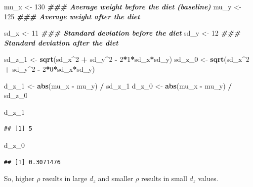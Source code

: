 \documentclass[
]{book}
\newenvironment{Shaded}{\begin{snugshade}}{\end{snugshade}}
\newcommand{\DecValTok}[1]{\textcolor[rgb]{0.00,0.00,0.81}{#1}}
\newcommand{\DocumentationTok}[1]{\textcolor[rgb]{0.56,0.35,0.01}{\textbf{\textit{#1}}}}
\newcommand{\FunctionTok}[1]{\textcolor[rgb]{0.13,0.29,0.53}{\textbf{#1}}}
\newcommand{\NormalTok}[1]{#1}
\newcommand{\OtherTok}[1]{\textcolor[rgb]{0.56,0.35,0.01}{#1}}
\newcommand{\SpecialCharTok}[1]{\textcolor[rgb]{0.81,0.36,0.00}{\textbf{#1}}}
\begin{document}
\begin{Shaded}
\begin{Highlighting}[]
\NormalTok{mu\_x }\OtherTok{\textless{}{-}} \DecValTok{130}     \DocumentationTok{\#\#\# Average weight before the diet (baseline)}
\NormalTok{mu\_y }\OtherTok{\textless{}{-}} \DecValTok{125}     \DocumentationTok{\#\#\# Average weight after the diet}

\NormalTok{sd\_x }\OtherTok{\textless{}{-}} \DecValTok{11}      \DocumentationTok{\#\#\# Standard deviation before the diet}
\NormalTok{sd\_y }\OtherTok{\textless{}{-}} \DecValTok{12}      \DocumentationTok{\#\#\# Standard deviation after the diet}

\NormalTok{sd\_z\_1 }\OtherTok{\textless{}{-}} \FunctionTok{sqrt}\NormalTok{(sd\_x}\SpecialCharTok{\^{}}\DecValTok{2} \SpecialCharTok{+}\NormalTok{ sd\_y}\SpecialCharTok{\^{}}\DecValTok{2} \SpecialCharTok{{-}} \DecValTok{2}\SpecialCharTok{*}\DecValTok{1}\SpecialCharTok{*}\NormalTok{sd\_x}\SpecialCharTok{*}\NormalTok{sd\_y)}
\NormalTok{sd\_z\_0 }\OtherTok{\textless{}{-}} \FunctionTok{sqrt}\NormalTok{(sd\_x}\SpecialCharTok{\^{}}\DecValTok{2} \SpecialCharTok{+}\NormalTok{ sd\_y}\SpecialCharTok{\^{}}\DecValTok{2} \SpecialCharTok{{-}} \DecValTok{2}\SpecialCharTok{*}\DecValTok{0}\SpecialCharTok{*}\NormalTok{sd\_x}\SpecialCharTok{*}\NormalTok{sd\_y)}

\NormalTok{d\_z\_1 }\OtherTok{\textless{}{-}} \FunctionTok{abs}\NormalTok{(mu\_x }\SpecialCharTok{{-}}\NormalTok{ mu\_y) }\SpecialCharTok{/}\NormalTok{ sd\_z\_1}
\NormalTok{d\_z\_0 }\OtherTok{\textless{}{-}} \FunctionTok{abs}\NormalTok{(mu\_x }\SpecialCharTok{{-}}\NormalTok{ mu\_y) }\SpecialCharTok{/}\NormalTok{ sd\_z\_0}

\NormalTok{d\_z\_1}
\end{Highlighting}
\end{Shaded}

\begin{verbatim}
## [1] 5
\end{verbatim}

\begin{Shaded}
\begin{Highlighting}[]
\NormalTok{d\_z\_0}
\end{Highlighting}
\end{Shaded}

\begin{verbatim}
## [1] 0.3071476
\end{verbatim}

So, higher \(\rho\) results in large \(d_{z}\) and smaller \(\rho\) results in small \(d_{z}\) values.
\end{document}
